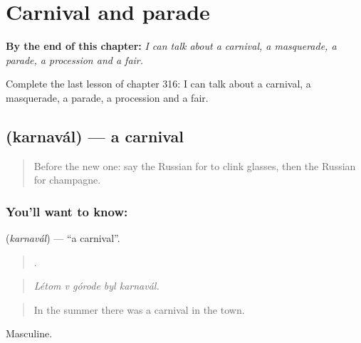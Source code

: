 
\chapter{Carnival and parade}
\label{ch:ru-carnival-and-parade}

\begin{chapteropening}
\textbf{By the end of this chapter:} \emph{I can talk about a carnival, a masquerade, a parade, a procession and a fair.}

Complete the last lesson of chapter 316: I can talk about a carnival, a masquerade, a parade, a procession and a fair.
\end{chapteropening}

\section[\texorpdfstring{\ru{карнавал} (karnavál)}{карнавал (karnavál)}]{ (karnavál) — a carnival}

\label{lesson:RU-C316-karnaval}



\begin{quote}
Before the new one: say the Russian for to clink glasses, then the Russian for champagne.
\end{quote}

\subsection*{You'll want to know: }
\textbf{} (\emph{karnavál}) — \textquotedblleft{}a carnival\textquotedblright{}.

\begin{quote}
    .
\end{quote}

\begin{quote}
\emph{Létom v górode byl karnavál.}
\end{quote}

\begin{quote}
In the summer there was a carnival in the town.
\end{quote}

Masculine.

